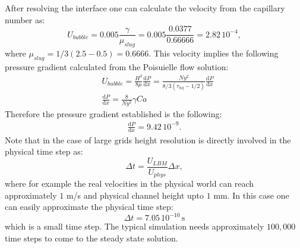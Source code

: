 \documentclass{article}
\begin{document}
\begin{description}
After resolving the interface one can  calculate the
  velocity from the capillary number as:
  \begin{equation}
  U_{bubble}=0.005 \frac{\gamma}{\mu_{slug}}=0.005
\frac{0.0377}{0.66666}=2.82\,10^{-4},
  \end{equation}
  where $\mu_{slug}=1/3 (2.5-0.5)=0.6666$.
  This velocity implies the following pressure gradient calculated from the
  Poisuielle flow solution:
  \begin{equation}
  \begin{aligned}
  &U_{bubble}=\frac{H^2}{8\mu} \frac{\mathrm{d}P}{\mathrm{d}x}=\frac{Ny^2}{8/3
  (\tau_{liq}-1/2)}\frac{\mathrm{d}P}{\mathrm{d}x}\\
  &\frac{\mathrm{d}P}{\mathrm{d}x}=\frac{8}{Ny^2}\gamma Ca
  \end{aligned}
  \end{equation}
  Therefore the pressure gradient established is the following:
  \begin{equation}
  \begin{aligned}
  \frac{\mathrm{d}P}{\mathrm{d}x}=9.42\, 10^{-9}.
  \end{aligned}
  \end{equation}
  Note that in the case of large grids  height resolution is directly
involved in	
the physical time step as:
\begin{equation}
\Delta t =\frac{U_{LBM}}{U_{phys}} \Delta x ,
\end{equation}
where for example the real velocities in the physical world can reach
approximately $1$ m/s and physical channel height upto $1$ mm. In this case one
can easily approximate the physical time step:
\begin{equation}
\Delta t = 7.05 \, 10^{-10} \,\mathrm{s}
\end{equation}
which is a small time step. The typical simulation needs approximately
{\color{red} $100,000$} time steps to come to the steady state solution.


\end{description}
\end{document}
